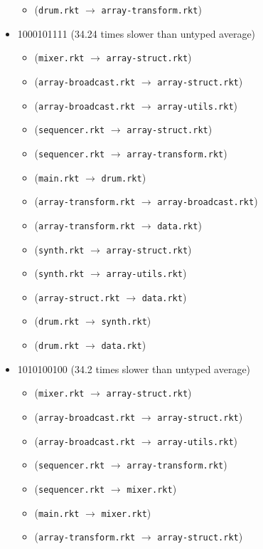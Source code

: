 \documentclass{article}
\newcommand{\mono}[1]{\texttt{#1}}
\begin{document}
\begin{itemize}
\begin{itemize}
  \item (\mono{drum.rkt} $\rightarrow$ \mono{array-transform.rkt})
  \end{itemize}
\item 1000101111 (34.24 times slower than untyped average)
  \begin{itemize}
  \item (\mono{mixer.rkt} $\rightarrow$ \mono{array-struct.rkt})
  \item (\mono{array-broadcast.rkt} $\rightarrow$ \mono{array-struct.rkt})
  \item (\mono{array-broadcast.rkt} $\rightarrow$ \mono{array-utils.rkt})
  \item (\mono{sequencer.rkt} $\rightarrow$ \mono{array-struct.rkt})
  \item (\mono{sequencer.rkt} $\rightarrow$ \mono{array-transform.rkt})
  \item (\mono{main.rkt} $\rightarrow$ \mono{drum.rkt})
  \item (\mono{array-transform.rkt} $\rightarrow$ \mono{array-broadcast.rkt})
  \item (\mono{array-transform.rkt} $\rightarrow$ \mono{data.rkt})
  \item (\mono{synth.rkt} $\rightarrow$ \mono{array-struct.rkt})
  \item (\mono{synth.rkt} $\rightarrow$ \mono{array-utils.rkt})
  \item (\mono{array-struct.rkt} $\rightarrow$ \mono{data.rkt})
  \item (\mono{drum.rkt} $\rightarrow$ \mono{synth.rkt})
  \item (\mono{drum.rkt} $\rightarrow$ \mono{data.rkt})
  \end{itemize}
\item 1010100100 (34.2 times slower than untyped average)
  \begin{itemize}
  \item (\mono{mixer.rkt} $\rightarrow$ \mono{array-struct.rkt})
  \item (\mono{array-broadcast.rkt} $\rightarrow$ \mono{array-struct.rkt})
  \item (\mono{array-broadcast.rkt} $\rightarrow$ \mono{array-utils.rkt})
  \item (\mono{sequencer.rkt} $\rightarrow$ \mono{array-transform.rkt})
  \item (\mono{sequencer.rkt} $\rightarrow$ \mono{mixer.rkt})
  \item (\mono{main.rkt} $\rightarrow$ \mono{mixer.rkt})
  \item (\mono{array-transform.rkt} $\rightarrow$ \mono{array-struct.rkt})

\end{itemize}
\end{itemize}
\end{document}
